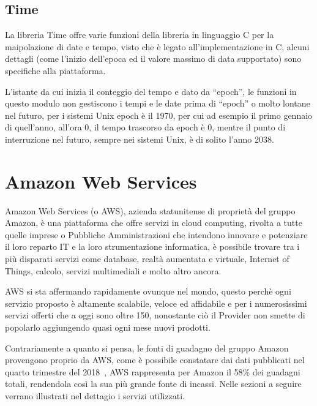 \subsection{Time}

La libreria Time offre varie funzioni della libreria in linguaggio C per la maipolazione di date e tempo, visto che è legato all'implementazione in C, 
alcuni dettagli (come l'inizio dell'epoca ed il valore massimo di data supportato) sono specifiche alla piattaforma.

L'istante da cui inizia il conteggio del tempo e dato da ``epoch'', le funzioni in questo modulo non gestiscono i tempi e le date prima di ``epoch'' o molto lontane 
nel futuro, per i sistemi Unix epoch è il 1970, per cui ad esempio il primo gennaio di quell'anno, all'ora 0, il tempo trascorso da epoch è 0, mentre il punto di 
interruzione nel futuro, sempre nei sistemi Unix, è di solito l'anno 2038.


\section{Amazon Web Services}
\label{sec:aws}
Amazon Web Services (o AWS), azienda statunitense di proprietà del gruppo Amazon, è una piattaforma che offre servizi in cloud computing, rivolta a tutte quelle
imprese o Pubbliche Amministrazioni che intendono innovare e potenziare il loro reparto IT e la loro strumentazione informatica, è possibile trovare tra i più
disparati servizi come database, realtà aumentata e virtuale, Internet of Things, calcolo, servizi multimediali e molto altro ancora.

AWS si sta affermando rapidamente ovunque nel mondo, questo perchè ogni servizio proposto è altamente scalabile, veloce ed affidabile e per i numerosissimi 
servizi offerti che a oggi sono oltre 150, nonostante ciò il Provider non smette di popolarlo aggiungendo quasi ogni mese nuovi prodotti.

Contrariamente a quanto si pensa, le fonti di guadagno del gruppo Amazon provengono proprio da AWS, come è possibile constatare dai dati pubblicati nel 
quarto trimestre del 2018~\cite{aws}, AWS rappresenta per Amazon il 58\% dei guadagni totali, rendendola così la sua più grande fonte di incassi.
Nelle sezioni a seguire verrano illustrati nel dettagio i servizi utilizzati. 

